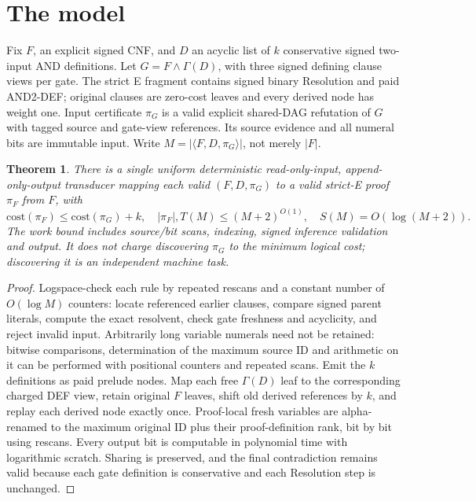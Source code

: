 \documentclass{article}
\newtheorem{theorem}{Theorem}
\begin{document}
\section*{The model}
Fix $F$, an explicit signed CNF, and $D$ an acyclic list of $k$ conservative signed two-input AND definitions. Let $G=F\wedge\Gamma(D)$, with three signed defining clause views per gate. The strict E fragment contains signed binary Resolution and paid AND2-DEF; original clauses are zero-cost leaves and every derived node has weight one. Input certificate $\pi_G$ is a valid explicit shared-DAG refutation of $G$ with tagged source and gate-view references. Its source evidence and all numeral bits are immutable input. Write $M=|\langle F,D,\pi_G\rangle|$, not merely $|F|$.
\begin{theorem}
There is a single uniform deterministic read-only-input, append-only-output transducer mapping each valid $(F,D,\pi_G)$ to a valid strict-E proof $\pi_F$ from $F$, with
\[ \mathrm{cost}(\pi_F)\le\mathrm{cost}(\pi_G)+k,\quad |\pi_F|,T(M)\le(M+2)^{O(1)},\quad S(M)=O(\log(M+2)). \]
The work bound includes source/bit scans, indexing, signed inference validation and output. It does not charge discovering $\pi_G$ to the minimum logical cost; discovering it is an independent machine task.
\end{theorem}
\begin{proof}
Logspace-check each rule by repeated rescans and a constant number of $O(\log M)$ counters: locate referenced earlier clauses, compare signed parent literals, compute the exact resolvent, check gate freshness and acyclicity, and reject invalid input. Arbitrarily long variable numerals need not be retained: bitwise comparisons, determination of the maximum source ID and arithmetic on it can be performed with positional counters and repeated scans. Emit the $k$ definitions as paid prelude nodes. Map each free $\Gamma(D)$ leaf to the corresponding charged DEF view, retain original $F$ leaves, shift old derived references by $k$, and replay each derived node exactly once. Proof-local fresh variables are alpha-renamed to the maximum original ID plus their proof-definition rank, bit by bit using rescans. Every output bit is computable in polynomial time with logarithmic scratch. Sharing is preserved, and the final contradiction remains valid because each gate definition is conservative and each Resolution step is unchanged.
\end{proof}
\end{document}
